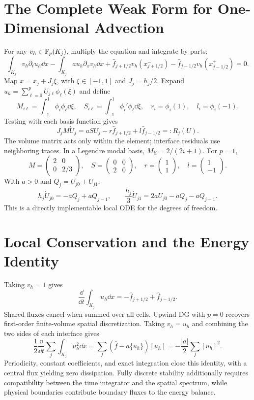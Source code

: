 \section{The Complete Weak Form for One-Dimensional Advection}
For any $v_h\in\mathbb P_p(K_j)$, multiply the equation and integrate by parts:
\[
\int_{K_j}v_h\partial_tu_h\dd x
-\int_{K_j}a u_h\partial_xv_h\dd x
+\widehat f_{j+1/2}v_h(x_{j+1/2}^{-})
-\widehat f_{j-1/2}v_h(x_{j-1/2}^{+})=0.
\]
Map $x=x_j+J_j\xi$, with $\xi\in[-1,1]$ and $J_j=h_j/2$.
Expand $u_h=\sum_{\ell=0}^pU_{j\ell}\phi_\ell(\xi)$ and define
\[
M_{i\ell}=\int_{-1}^1\phi_i\phi_\ell\dd\xi,\quad
S_{i\ell}=\int_{-1}^1\phi_i'\phi_\ell\dd\xi,\quad
r_i=\phi_i(1),\quad l_i=\phi_i(-1).
\]
Testing with each basis function gives
\begin{equation}\label{eq:dg-local}
J_jM\dot U_j=a S U_j-r\widehat f_{j+1/2}+l\widehat f_{j-1/2}
=:R_j(U).
\end{equation}
The volume matrix acts only within the element; interface residuals use neighboring traces.
In a Legendre modal basis,
$M_{ii}=2/(2i+1)$. For $p=1$,
\[
M=\begin{pmatrix}2&0\\0&2/3\end{pmatrix},\quad
S=\begin{pmatrix}0&0\\2&0\end{pmatrix},\quad
r=\begin{pmatrix}1\\1\end{pmatrix},\quad
l=\begin{pmatrix}1\\-1\end{pmatrix}.
\]
With $a>0$ and $Q_j=U_{j0}+U_{j1}$,
\[
h_j\dot U_{j0}=-aQ_j+aQ_{j-1},\qquad
\frac{h_j}{3}\dot U_{j1}=2aU_{j0}-aQ_j-aQ_{j-1}.
\]
This is a directly implementable local ODE for the degrees of freedom.

\section{Local Conservation and the Energy Identity}
Taking $v_h=1$ gives
\[
\frac{\dd}{\dd t}\int_{K_j}u_h\dd x
=-\widehat f_{j+1/2}+\widehat f_{j-1/2}.
\]
Shared fluxes cancel when summed over all cells. Upwind DG with $p=0$ recovers first-order finite-volume spatial discretization.
Taking $v_h=u_h$ and combining the two sides of each interface gives
\[
\frac12\frac{\dd}{\dd t}\sum_j\int_{K_j}u_h^2\dd x
=\sum_f\left(\widehat f-a\{u_h\}\right)[u_h]
=-\frac{|a|}{2}\sum_f[u_h]^2.
\]
Periodicity, constant coefficients, and exact integration close this identity, with a central flux yielding zero dissipation. Fully discrete stability additionally requires compatibility between the time integrator and the spatial spectrum, while physical boundaries contribute boundary fluxes to the energy balance.

